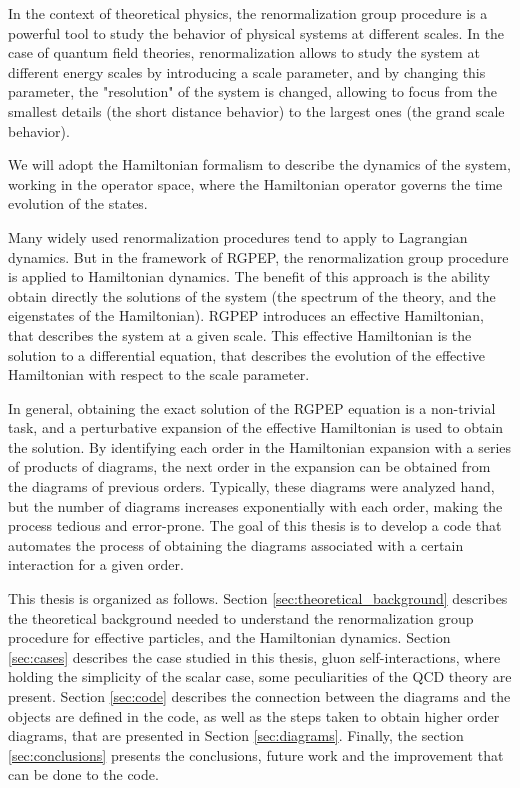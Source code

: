 \documentclass[11pt,a4paper,twoside,pdf]{article}
\numberwithin{equation}{section}
\begin{document}
In the context of theoretical physics, the renormalization group procedure 
\cite{1983RvMP...55..583W}is a 
powerful tool to study the behavior of physical systems at different scales. In
the case of quantum field theories, renormalization allows to study the system
at different energy scales by introducing a scale parameter, and by changing 
this parameter, the "resolution" of the system is changed, allowing to focus from 
the smallest details (the short distance behavior) to the largest ones (the grand 
scale behavior). 

We will adopt the Hamiltonian formalism to describe the dynamics of the system, 
working in the operator space, where the Hamiltonian operator governs the time
evolution of the states. 

Many widely used renormalization procedures tend to apply to Lagrangian dynamics. But 
in the framework of RGPEP\cite{PhysRevD.48.5863}, the renormalization group procedure is applied to 
Hamiltonian dynamics. The benefit of this approach is the ability obtain directly 
the solutions of the system (the spectrum of the theory, and the eigenstates of the 
Hamiltonian). RGPEP introduces an effective Hamiltonian, that describes the system at a
given scale. This effective Hamiltonian is the solution to a differential equation,
that describes the evolution of the effective Hamiltonian with respect to the
scale parameter.

In general, obtaining the exact solution of the RGPEP equation is a non-trivial task, 
and a perturbative expansion of the effective Hamiltonian is used to obtain the 
solution. By identifying each order in the Hamiltonian expansion with a series of 
products of diagrams, the next order in the expansion can be obtained from the 
diagrams of previous orders. Typically, these diagrams were analyzed hand, but the 
number of diagrams increases exponentially with each order, making the process 
tedious and error-prone. The goal of this thesis is to develop a code that automates 
the process of obtaining the diagrams associated with a certain interaction for a 
given order.

This thesis is organized as follows. Section \ref{sec:theoretical_background} describes
the theoretical background needed to understand the renormalization group procedure
for effective particles, and the Hamiltonian dynamics. Section \ref{sec:cases}
describes the case studied in this thesis, gluon self-interactions, where
holding the simplicity of the scalar case, some peculiarities of the QCD theory are 
present. Section \ref{sec:code} describes the connection between the diagrams 
and the objects are defined in the code, as well as the steps taken to obtain higher 
order diagrams, that are presented in Section \ref{sec:diagrams}. Finally, the 
section \ref{sec:conclusions} presents the conclusions, future work and the 
improvement that can be done to the code.
\end{document}
